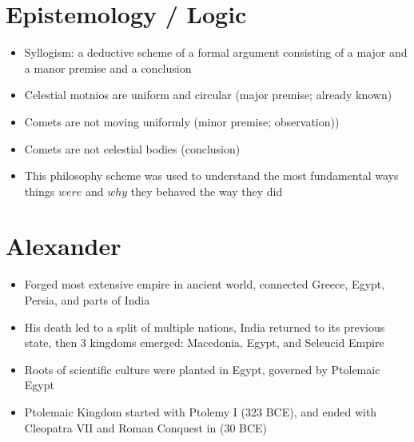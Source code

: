 \documentclass{article}
\begin{document}
\section*{Epistemology / Logic}
\begin{itemize}
  \item Syllogism: a deductive scheme of a formal argument consisting of a major and a manor premise
    and a conclusion
  \item Celestial motnios are uniform and circular (major premise; already known)
  \item Comets are not moving uniformly (minor premise; observation))
  \item Comets are not celestial bodies (conclusion)
  \item This philosophy scheme was used to understand the most
    fundamental ways things $were$ and $why$ they behaved the way they did
\end{itemize}

\section*{Alexander}
\begin{itemize}
  \item Forged most extensive empire in ancient world,
    connected Greece, Egypt, Persia, and parts of India
  \item His death led to a split of multiple nations, India returned to its previous state,
    then 3 kingdoms emerged: Macedonia, Egypt, and Seleucid Empire
  \item Roots of scientific culture were planted in Egypt,
    governed by Ptolemaic Egypt
  \item Ptolemaic Kingdom started with Ptolemy I (323 BCE),
    and ended with Cleopatra VII and Roman Conquest in (30 BCE)
\end{itemize}
\end{document}
